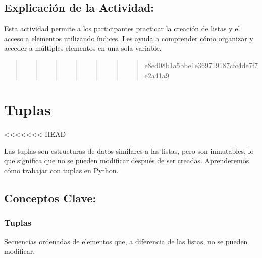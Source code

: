\documentclass[
  a4paper,
  onepage,
  openany]{scrreprt}
\begin{document}
\hypertarget{explicaciuxf3n-de-la-actividad-17}{%
\section{Explicación de la
Actividad:}\label{explicaciuxf3n-de-la-actividad-17}}

Esta actividad permite a los participantes practicar la creación de
listas y el acceso a elementos utilizando índices. Les ayuda a
comprender cómo organizar y acceder a múltiples elementos en una sola
variable.

\begin{quote}
\begin{quote}
\begin{quote}
\begin{quote}
\begin{quote}
\begin{quote}
\begin{quote}
e8ed08b1a5bbe1e369719187cfc4de7f7e2a41a9
\end{quote}
\end{quote}
\end{quote}
\end{quote}
\end{quote}
\end{quote}
\end{quote}

\hypertarget{tuplas}{%
\chapter{Tuplas}\label{tuplas}}

\textless\textless\textless\textless\textless\textless\textless{} HEAD

Las tuplas son estructuras de datos similares a las listas, pero son
inmutables, lo que significa que no se pueden modificar después de ser
creadas. Aprenderemos cómo trabajar con tuplas en Python.

\hypertarget{conceptos-clave-20}{%
\section{Conceptos Clave:}\label{conceptos-clave-20}}

\hypertarget{tuplas-1}{%
\subsection{Tuplas}\label{tuplas-1}}

Secuencias ordenadas de elementos que, a diferencia de las listas, no se
pueden modificar.
\end{document}

